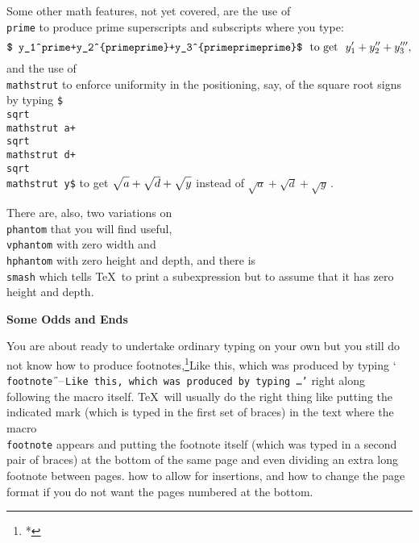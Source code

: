 Some other math features, not yet covered, are the use of {\tt \\prime} to produce
prime superscripts and subscripts where you type:
$$\hbox{{\tt\$\ y\und{}1\^{}\\prime+y\und{}2\^{}\lbr\\prime\\prime\rbr+y\und{}3\^{}\lbr
\\prime\\prime\\prime\rbr\$} \ to get \ }
y_1^\prime+y_2^{\prime\prime}+y_3^{\prime\prime\prime},$$
\smallskip
and the use of {\tt \\mathstrut} to enforce uniformity in the positioning,
say, of the square root signs by typing
{\tt \$\\sqrt\lbr\\mathstrut a\rbr+\\sqrt\lbr\\mathstrut d\rbr+\\sqrt\lbr\\mathstrut y\rbr\$} to
get $\sqrt{\mathstrut a}+\sqrt{\mathstrut d}+\sqrt{\mathstrut y}$
instead of $\sqrt a+\sqrt d+\sqrt y\,$.

There are, also, two variations on {\tt \\phantom} that you will find
useful, {\tt \\vphantom} with zero width and {\tt \\hphantom} with zero
height and depth, and there is {\tt \\smash} which tells \TeX\ to print 
a subexpression but to assume that it has zero height and depth.

{\bf Some Odds and Ends}

\nobreak
You are about ready to undertake ordinary typing on your own but you still
do not know how to produce footnotes,\footnote{*}{Like this, which was
produced by typing `{\tt \\footnote\lbr *$\rbr\lbr$Like this, which was produced by
typing
\dots \rbr'} right along following the macro itself.
 \TeX\ will usually do the right thing
like putting the indicated mark (which is typed in the first set of braces)
in the text where the macro {\tt \\footnote} appears and putting the footnote
itself (which was typed in a second pair of braces) at the bottom of the
same page and even dividing an extra long footnote between pages.}
how to allow for insertions, and how to change the page format if you do not 
want the pages numbered at the bottom.

